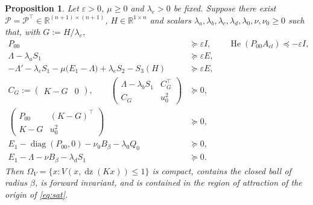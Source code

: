 \documentclass[preprint,12pt,authoryear]{elsarticle}
\newtheorem{proposition}[theorem]{Proposition}
\theoremstyle{definition}
\theoremstyle{remark}
\newcommand{\R}{\mathbb{R}}
\newcommand{\tr}{^{\top}}
\newcommand{\PP}{\mathcal{P}}
\newcommand{\dz}{\operatorname{dz}}
\DeclareMathOperator{\He}{He}
\DeclareMathOperator{\diag}{diag}
\begin{document}
\begin{proposition}\label{prop:satLMI}
Let $\varepsilon>0$, $\mu\ge0$ and $\lambda_e>0$ be fixed. Suppose there exist $\PP=\PP\tr\in\R^{(n+1)\times(n+1)}$, $H\in\R^{1\times n}$ and scalars $\lambda_a,\lambda_b,\lambda_c,\lambda_d,\lambda_0,\nu,\nu_0\ge0$ such that, with $G:=H/\lambda_e$,
\begin{align}
P_{00}&\succeq\varepsilon I,\qquad \He(P_{00}A_{cl})\preceq-\varepsilon I,\label{eq:R0}\\
\Lambda-\lambda_aS_1&\succeq\varepsilon E,\label{eq:Rpos}\\
-\Lambda'-\lambda_cS_1-\mu\big(E_1-\Lambda\big)+\lambda_eS_2-S_3(H)&\succeq\varepsilon E,\label{eq:Rdec}\\
C_G:=\begin{pmatrix}K-G&0\end{pmatrix},\qquad\begin{pmatrix}\Lambda-\lambda_bS_1&C_G\tr\\ C_G&u_0^2\end{pmatrix}&\succeq0,\label{eq:Rinc}\\
\begin{pmatrix}P_{00}&(K-G)\tr\\K-G&u_0^2\end{pmatrix}&\succeq0,\label{eq:Rinc0}\\
E_1-\diag(P_{00},0)-\nu_0B_\beta-\lambda_0Q_0&\succeq0,\label{eq:Rball0}\\
E_1-\Lambda-\nu B_\beta-\lambda_dS_1&\succeq0.\label{eq:Rball}
\end{align}
Then $\Omega_V=\{x:V(x,\dz(Kx))\le1\}$ is compact, contains the closed ball of radius $\beta$, is forward invariant, and is contained in the region of attraction of the origin of \eqref{eq:sat}.
\end{proposition}
\end{document}
